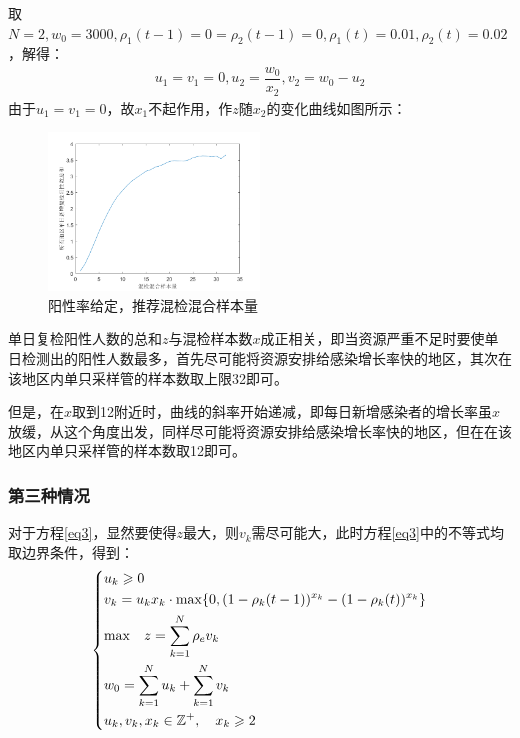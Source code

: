 \documentclass[withoutpreface,bwprint]{cumcmthesis} %
\begin{document}
取$N=2,w_0=3000,\rho_1(t-1)=0=\rho_2(t-1)=0,\rho_1(t)=0.01,\rho_2(t)=0.02$，解得：
\begin{align*}
    u_1=v_1=0, u_2=\dfrac{w_0}{x_2},v_2=w_0-u_2
\end{align*}
由于$u_1=v_1=0$，故$x_1$不起作用，作$z$随$x_2$的变化曲线如图所示：
\begin{figure}[H]
\centering
\includegraphics[width=0.5\textwidth]{fig_pro2.png}
\caption{阳性率给定，推荐混检混合样本量}
\label{pro1}
\end{figure}

单日复检阳性人数的总和$z$与混检样本数$x$成正相关，即当资源严重不足时要使单日检测出的阳性人数最多，首先尽可能将资源安排给感染增长率快的地区，其次在该地区内单只采样管的样本数取上限32即可。

但是，在$x$取到12附近时，曲线的斜率开始递减，即每日新增感染者的增长率虽$x$放缓，从这个角度出发，同样尽可能将资源安排给感染增长率快的地区，但在在该地区内单只采样管的样本数取12即可。

\subsubsection{第三种情况}
对于方程\ref{eq3}，显然要使得$z$最大，则$v_k$需尽可能大，此时方程\ref{eq3}中的不等式均取边界条件，得到：
\begin{align}
\label{eq2solution1}
    \left\{
    \begin{aligned}
        &u_k \geqslant 0 \\
        &v_k =u_k x_k\cdot {\rm max}
         \{0,(1-\rho_k(t-1))^{x_k}-(1-\rho_k(t))^{x_k} \} \\
        &{\rm max} \quad z = \sum^N_{k=1}\rho_e v_k  \\
        &w_0 =\sum^N_{k=1} u_k +\sum^N_{k=1} v_k  \\
        &u_k,v_k,x_k\in\mathbb{Z^+}, \quad x_k \geqslant 2\\
    \end{aligned}
    \right.
\end{align}
\end{document}
